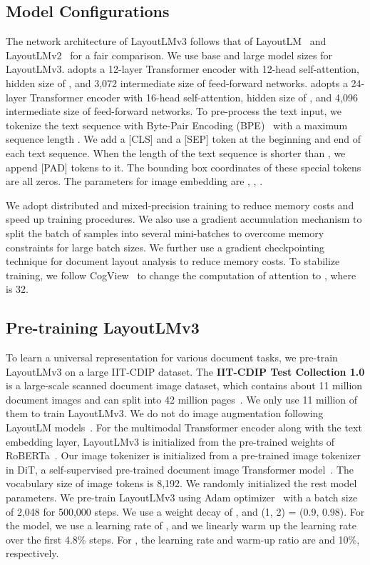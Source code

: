 \documentclass[sigconf]{acmart}
\begin{document}
\subsection{Model Configurations}
The network architecture of LayoutLMv3 follows that of LayoutLM~\cite{xu2020layoutlm} and LayoutLMv2~\cite{xu-etal-2021-layoutlmv2} for a fair comparison.
We use base and large model sizes for LayoutLMv3.
 adopts a 12-layer Transformer encoder with 12-head self-attention, hidden size of , and 3,072 intermediate size of feed-forward networks.
 adopts a 24-layer Transformer encoder with 16-head self-attention, hidden size of , and 4,096 intermediate size of feed-forward networks.
To pre-process the text input, we tokenize the text sequence with Byte-Pair Encoding (BPE)~\cite{sennrich2016neural} with a maximum sequence length .
We add a [CLS] and a [SEP] token at the beginning and end of each text sequence. When the length of the text sequence is shorter than , we append [PAD] tokens to it. The bounding box coordinates of these special tokens are all zeros.
The parameters for image embedding are , , .

We adopt distributed and mixed-precision training to reduce memory costs and speed up training procedures.
We also use a gradient accumulation mechanism to split the batch of samples into several mini-batches to overcome memory constraints for large batch sizes.
We further use a gradient checkpointing technique for document layout analysis to reduce memory costs.
To stabilize training, we follow CogView~\cite{ding2021cogview} to change the computation of attention to , where  is 32.


\subsection{Pre-training LayoutLMv3}
To learn a universal representation for various document tasks, we pre-train LayoutLMv3 on a large IIT-CDIP dataset. 
The \textbf{IIT-CDIP Test Collection 1.0} is a large-scale scanned document image dataset, which contains about 11 million document images and can split into 42 million pages~\cite{Lewis:2006:BTC:1148170.1148307}.
We only use 11 million of them to train LayoutLMv3.
We do not do image augmentation following LayoutLM models~\cite{xu2020layoutlm, xu-etal-2021-layoutlmv2}. 
For the multimodal Transformer encoder along with the text embedding layer, LayoutLMv3 is initialized from the pre-trained weights of RoBERTa~\cite{liu2019roberta}.
Our image tokenizer is initialized from a pre-trained image tokenizer in DiT, a self-supervised pre-trained document image Transformer model~\cite{li2022dit}.
The vocabulary size of image tokens is 8,192.
We randomly initialized the rest model parameters.
We pre-train LayoutLMv3 using Adam optimizer~\cite{kingma2014adam} with a batch size of 2,048 for 500,000 steps.
We use a weight decay of , and (1, 2) = (0.9, 0.98).
For the  model, we use a learning rate of , and we linearly warm up the learning rate over the first 4.8\% steps.
For , the learning rate and warm-up ratio are  and 10\%, respectively.
\end{document}
